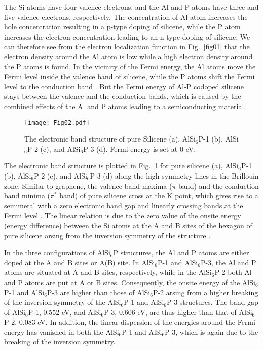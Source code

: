 \documentclass[5p,twocolumn]{elsarticle}
\def\fig#1{Fig.\ \ref{#1}}
\begin{document}
The Si atoms have four valence electrons, and the Al and P atoms have 
three and five valence electrons, respectively. The concentration of Al atom increases the hole concentration resulting in a p-type doping of silicene, while the P atom increases the electron concentration leading to an n-type doping of silicene. We can therefore see from the electron localization function in \fig{fig01} that the electron density around the Al atom is low while a high electron density around the P atoms is found. 
In the vicinity of the Fermi energy, the Al atoms move the Fermi level inside the valence band of silicene, while the P atoms shift the Fermi level to the conduction band \cite{HERNANDEZCOCOLETZI2018242}. But the Fermi energy of Al-P codoped silicene stays between the valence and the conduction bands, which is caused by the combined effects of the Al and P atoms leading to a semiconducting material.  
%
\begin{figure}[htb]
	\centering
	\texttt{[image: Fig02.pdf]}
	\caption{The electronic band structure of pure Silicene (a), AlSi$_6$P-1 (b), AlSi$_6$P-2 (c), and AlSi$_6$P-3 (d).  Fermi energy is set at 0 eV. }
	\label{fig02}
\end{figure}
%
The electronic band structure is plotted in \fig{fig02} for pure silicene (a), AlSi$_6$P-1 (b), AlSi$_6$P-2 (c), and AlSi$_6$P-3 (d) along the high symmetry lines
in the Brillouin zone. Similar to graphene, the valence band maxima ($\pi$ band) and the conduction band minima ($\pi^*$ band) of pure silicene cross at the K point, which gives rise to a semimetal with a zero electronic band gap and linearly crossing bands at the Fermi level \cite{ABDULLAH2021114644}.
The linear relation is due to the zero value of the onsite energy (energy difference) between the Si atoms at the A and B sites of the hexagon of pure silicene arsing from the inversion symmetry of the structure \cite{aliofkhazraei2016graphene}.

In the three configurations of AlSi$_6$P structures, the Al and P atoms are either doped at the A and B sites or A(B) site. In AlSi$_6$P-1 and AlSi$_6$P-3, the Al and P atoms are situated at A and B sites, respectively, while in the AlSi$_6$P-2 both Al and P atoms are put at A or B sites. Consequently, 
the onsite energy of the AlSi$_6$P-1 and AlSi$_6$P-3 are higher than those of AlSi$_6$P-2 arsing from a higher breaking of the inversion symmetry of the AlSi$_6$P-1 and AlSi$_6$P-3 structures. 
The band gap of AlSi$_6$P-1, $0.552$ eV, and AlSi$_6$P-3, $0.606$ eV, are thus higher than that of AlSi$_6$P-2, $0.083$ eV.
In addition, the linear dispersion of the energies around the Fermi energy has vanished in both  
the AlSi$_6$P-1 and AlSi$_6$P-3, which is again due to the breaking of the inversion symmetry.
\end{document}
